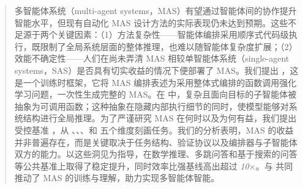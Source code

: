 
\begin{abstract}




多智能体系统（multi-agent systems，MAS）有望通过智能体间的协作提升智能水平，但现有自动化 MAS 设计方法的实际表现仍未达到预期。这些不足源于两个关键因素：（1）方法复杂性——智能体编排采用顺序式代码级执行，既限制了全局系统层面的整体推理，也难以随智能体复杂度扩展；（2）效能不确定性——人们在尚未弄清 MAS 相较单智能体系统（single-agent systems，SAS）是否具有切实收益的情况下便部署了 MAS。我们提出 \ourframework，这是一个训练时框架，它将 MAS 编排表述为采用整体式编排的函数调用强化学习问题，一次性生成完整的 MAS。在 \ourframework 中，复杂且面向目标的子智能体被抽象为可调用函数；这种抽象在隐藏内部执行细节的同时，使模型能够对系统结构进行全局推理。为了严谨研究 MAS 在何时以及为何有益，我们提出受控基准 \ourbenchmark，从 \depth、\horizon、\breadth、\myparallel 和 \robustness 五个维度刻画任务。我们的分析表明，MAS 的收益并非普遍存在，而是关键取决于任务结构、验证协议以及编排器与子智能体双方的能力。以这些洞见为指导，\ourframework 在数学推理、多跳问答和基于搜索的问答等公共基准上取得了稳定提升，{同时效率比强基线高出超过 \textit{10$\times$}}。\ourframework 与 \ourbenchmark 共同推动了 MAS 的训练与理解，助力实现多智能体智能。








\end{abstract}
